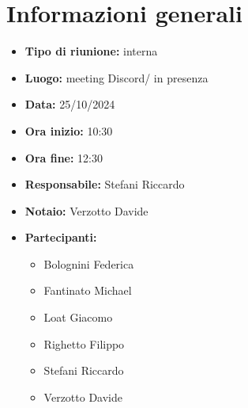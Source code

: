 \section{Informazioni generali}

\begin{itemize}
    \item \textbf{Tipo di riunione:} interna
    \item \textbf{Luogo:} meeting Discord/ in presenza
    \item \textbf{Data:} 25/10/2024
    \item \textbf{Ora inizio:} 10:30
    \item \textbf{Ora fine:} 12:30
    \item \textbf{Responsabile:} Stefani Riccardo
    \item \textbf{Notaio:} Verzotto Davide
    \item \textbf{Partecipanti:}
    \begin{itemize}
        \renewcommand{\labelitemii}{--}
        \item Bolognini Federica
        \item Fantinato Michael
        \item Loat Giacomo
        \item Righetto Filippo
        \item Stefani Riccardo
        \item Verzotto Davide
    \end{itemize}
\end{itemize}